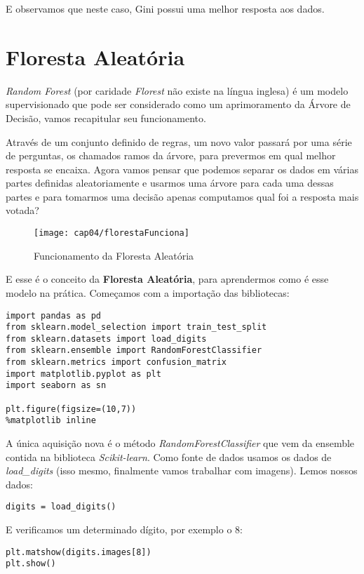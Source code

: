 E observamos que neste caso, Gini possui uma melhor resposta aos dados.

\section{Floresta Aleatória}
\textit{Random Forest} (por caridade \textit{Florest} não existe na língua inglesa) é um modelo supervisionado que pode ser considerado como um aprimoramento da Árvore de Decisão, vamos recapitular seu funcionamento.

Através de um conjunto definido de regras, um novo valor passará por uma série de perguntas, os chamados ramos da árvore, para prevermos em qual melhor resposta se encaixa. Agora vamos pensar que podemos separar os dados em várias partes definidas aleatoriamente e usarmos uma árvore para cada uma dessas partes e para tomarmos uma decisão apenas computamos qual foi a resposta mais votada?
\begin{figure}[H]
	\centering
	\texttt{[image: cap04/florestaFunciona]}
	\caption{Funcionamento da Floresta Aleatória}
\end{figure}

E esse é o conceito da \textbf{Floresta Aleatória}, para aprendermos como é esse modelo na prática. Começamos com a importação das bibliotecas:
\begin{lstlisting}[]
import pandas as pd
from sklearn.model_selection import train_test_split
from sklearn.datasets import load_digits
from sklearn.ensemble import RandomForestClassifier
from sklearn.metrics import confusion_matrix
import matplotlib.pyplot as plt
import seaborn as sn

plt.figure(figsize=(10,7))
%matplotlib inline
\end{lstlisting}

A única aquisição nova é o método \textit{RandomForestClassifier} que vem da ensemble contida na biblioteca \textit{Scikit-learn}. Como fonte de dados usamos os dados de \textit{load\_digits} (isso mesmo, finalmente vamos trabalhar com imagens). Lemos nossos dados:
\begin{lstlisting}[]
digits = load_digits()
\end{lstlisting}

E verificamos um determinado dígito, por exemplo o 8:
\begin{lstlisting}[]
plt.matshow(digits.images[8])
plt.show()
\end{lstlisting}


